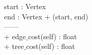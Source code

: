 {
	start : Vertex \\
	end : Vertex
}
{
+ \dunder (start, end) \\

------\\

+ edge$\_$cost(self) : float\\
+ tree$\_$cost(self) : float
}